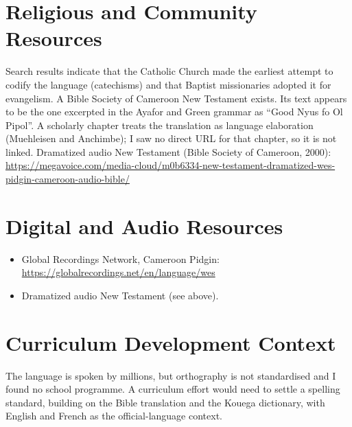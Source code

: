 \documentclass[12pt]{article}
\begin{document}
\section{Religious and Community Resources}
Search results indicate that the Catholic Church made the earliest attempt to codify the language (catechisms) and that Baptist missionaries adopted it for evangelism. A Bible Society of Cameroon New Testament exists. Its text appears to be the one excerpted in the Ayafor and Green grammar as ``Good Nyus fo Ol Pipol''. A scholarly chapter treats the translation as language elaboration (Muehleisen and Anchimbe); I saw no direct URL for that chapter, so it is not linked. Dramatized audio New Testament (Bible Society of Cameroon, 2000): \url{https://megavoice.com/media-cloud/m0b6334-new-testament-dramatized-wes-pidgin-cameroon-audio-bible/}

\section{Digital and Audio Resources}
\begin{itemize}
\item Global Recordings Network, Cameroon Pidgin: \url{https://globalrecordings.net/en/language/wes}
\item Dramatized audio New Testament (see above).
\end{itemize}

\section{Curriculum Development Context}
The language is spoken by millions, but orthography is not standardised and I found no school programme. A curriculum effort would need to settle a spelling standard, building on the Bible translation and the Kouega dictionary, with English and French as the official-language context.
\end{document}
